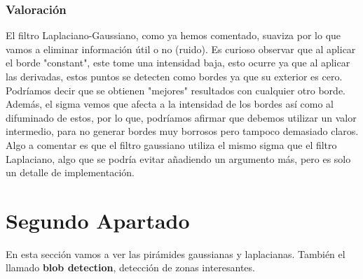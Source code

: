 \documentclass{article}
\begin{document}
\newpage

\subsubsection{Valoración}
El filtro Laplaciano-Gaussiano, como ya hemos comentado, suaviza por lo que vamos a eliminar información útil o no (ruido).
\newline
\newline
Es curioso observar que al aplicar el borde "constant", este tome una intensidad baja, esto ocurre ya que al aplicar las derivadas, estos puntos se detecten como bordes ya que su exterior es cero. Podríamos decir que se obtienen "mejores" resultados con cualquier otro borde.
\newline
\newline
Además, el sigma vemos que afecta a la intensidad de los bordes así como al difuminado de estos, por lo que, podríamos afirmar que debemos utilizar un valor intermedio, para no generar bordes muy borrosos pero tampoco demasiado claros.
\newline
\newline
Algo a comentar es que el filtro gaussiano utiliza el mismo sigma que el filtro Laplaciano, algo que se podría evitar añadiendo un argumento más, pero es solo un detalle de implementación.

\newpage

\section{Segundo Apartado}
En esta sección vamos a ver las pirámides gaussianas y laplacianas. También el llamado \textbf{blob detection}, detección de zonas interesantes.
\end{document}

